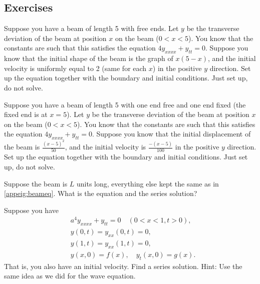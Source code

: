 \subsection{Exercises}

\begin{exercise}
Suppose you have a beam of length 5 with free ends.  Let $y$ be the
transverse deviation of the beam at position $x$ on the beam ($0 < x < 5$).
You know that the
constants are such that this satisfies the equation
$4 y_{xxxx} + y_{tt} = 0$.
Suppose you know that the initial shape of the beam is the graph of
$x(5-x)$, and the initial velocity is uniformly equal to 2 (same for each $x$)
in the positive $y$ direction.  Set up the equation together with the
boundary and initial conditions.  Just set up, do not solve.
\end{exercise}

\begin{exercise}
Suppose you have a beam of length 5 with one end free and one end fixed
(the fixed end is at $x=5$).
Let $y$ be the
transverse deviation of the beam at position $x$ on the beam ($0 < x < 5$).
You know that the
constants are such that this satisfies the equation $4 y_{xxxx} + y_{tt} = 0$.
Suppose you know that the initial displacement of the beam
is $\frac{{(x-5)}^2}{50}$, and the initial velocity is $\frac{-(x-5)}{100}$
in the positive $y$ direction.  Set up the equation together with the
boundary and initial conditions.  Just set up, do not solve.
\end{exercise}

\begin{exercise}
Suppose the beam is $L$ units long, everything else kept the same
as in \eqref{appeig:beameq}.  What is the equation and the series
solution?
\end{exercise}

\begin{exercise}
Suppose you have 
\begin{equation*}
\begin{aligned}
& a^4 y_{xxxx} + y_{tt} = 0 \quad (0 < x < 1, t > 0) , \\
& y(0,t) = y_{xx}(0,t) = 0,\\
& y(1,t) = y_{xx}(1,t) = 0 ,\\
& y(x,0) = f(x), \quad y_{t}(x,0) = g(x) .
\end{aligned}
\end{equation*}
That is, you also have an initial velocity.  Find a series solution.  Hint:
Use the same idea as we did for the wave equation.
\end{exercise}

